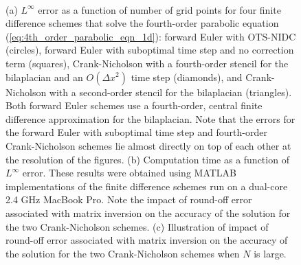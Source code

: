 \documentclass[fleqn,12pt,twoside]{article}
\def\dx{\Delta x}
\begin{document}
\begin{figure}[tb]
\begin{center}
\ \  
\ \ 
\caption{(a) $L^\infty$ error as a function of number of grid points for four
finite difference schemes that solve the fourth-order parabolic equation
(\ref{eq:4th_order_parabolic_eqn_1d}):
forward Euler with OTS-NIDC (circles),
forward Euler with suboptimal time step and no correction term (squares),
Crank-Nicholson with a fourth-order stencil for the bilaplacian and
an $O(\dx^2)$ time step (diamonds), and Crank-Nicholson with a second-order 
stencil for the bilaplacian (triangles).
Both forward Euler schemes use a fourth-order, central finite difference 
approximation for the bilaplacian.
Note that the errors for the forward Euler with suboptimal time step and 
fourth-order Crank-Nicholson schemes lie almost directly on top of each 
other at the resolution of the figures.  
(b) Computation time as a function of $L^\infty$ error.  These results were
obtained using MATLAB implementations of the finite difference schemes run on
a dual-core 2.4 GHz MacBook Pro.  Note the impact of round-off error
associated with matrix inversion on the accuracy of the solution for the two
Crank-Nicholson schemes.
(c) Illustration of impact of round-off error associated with matrix inversion
on the accuracy of the solution for the two Crank-Nicholson schemes when
$N$ is large.
}
\end{center}
\end{figure}
\end{document}
